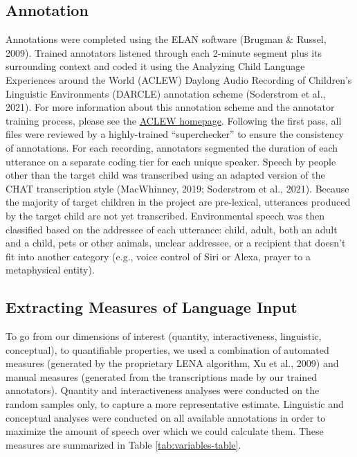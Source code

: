 \documentclass[
  man]{apa6}
\begin{document}
\hypertarget{annotation}{%
\subsection{Annotation}\label{annotation}}

Annotations were completed using the ELAN software (Brugman \& Russel, 2009). Trained annotators listened through each 2-minute segment plus its surrounding context and coded it using the Analyzing Child Language Experiences around the World (ACLEW) Daylong Audio Recording of Children's Linguistic Environments (DARCLE) annotation scheme (Soderstrom et al., 2021). For more information about this annotation scheme and the annotator training process, please see the \href{https://sites.google.com/view/aclewdid/home}{ACLEW homepage}. Following the first pass, all files were reviewed by a highly-trained ``superchecker'' to ensure the consistency of annotations. For each recording, annotators segmented the duration of each utterance on a separate coding tier for each unique speaker. Speech by people other than the target child was transcribed using an adapted version of the CHAT transcription style (MacWhinney, 2019; Soderstrom et al., 2021). Because the majority of target children in the project are pre-lexical, utterances produced by the target child are not yet transcribed. Environmental speech was then classified based on the addressee of each utterance: child, adult, both an adult and a child, pets or other animals, unclear addressee, or a recipient that doesn't fit into another category (e.g., voice control of Siri or Alexa, prayer to a metaphysical entity).

\hypertarget{extracting-measures-of-language-input}{%
\subsection{Extracting Measures of Language Input}\label{extracting-measures-of-language-input}}

To go from our dimensions of interest (quantity, interactiveness, linguistic, conceptual), to quantifiable properties, we used a combination of automated measures (generated by the proprietary LENA algorithm, Xu et al., 2009) and manual measures (generated from the transcriptions made by our trained annotators). Quantity and interactiveness analyses were conducted on the random samples only, to capture a more representative estimate. Linguistic and conceptual analyses were conducted on all available annotations in order to maximize the amount of speech over which we could calculate them. These measures are summarized in Table \ref{tab:variables-table}.
\end{document}
